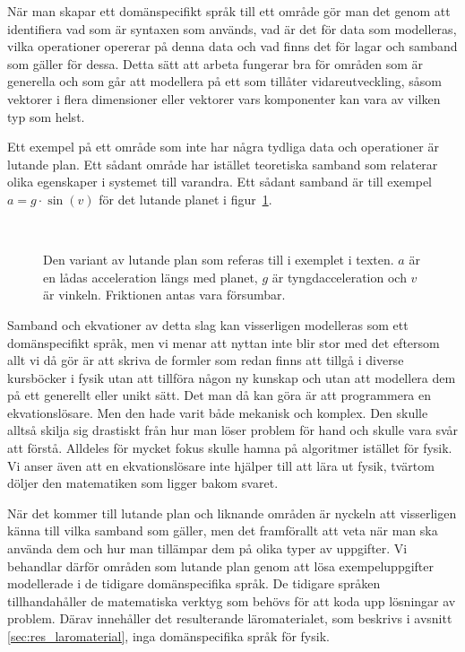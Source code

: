 \begin{draft}
När man skapar ett domänspecifikt språk till ett område gör man det genom att
identifiera vad som är syntaxen som används, vad är det för data som modelleras,
vilka operationer opererar på denna data och vad finns det för lagar och samband
som gäller för dessa. Detta sätt att arbeta fungerar bra för områden som är
generella och som går att modellera på ett som tillåter vidareutveckling, såsom
vektorer i flera dimensioner eller vektorer vars komponenter kan vara av vilken
typ som helst.

Ett exempel på ett område som inte har några tydliga data och operationer är
lutande plan. Ett sådant område har istället teoretiska samband som relaterar
olika egenskaper i systemet till varandra. Ett sådant samband är till exempel $a = g \cdot \sin(v)$ för det lutande planet i figur~\ref{fig:lutande_plan}.

\begin{figure}[tph]
  \centering
  \caption{Den variant av lutande plan som referas till i exemplet i texten. $a$
  är en lådas acceleration längs med planet, $g$ är tyngdacceleration och $v$ är
  vinkeln. Friktionen antas vara försumbar.}~\label{fig:lutande_plan}
\end{figure}

Samband och ekvationer av detta slag kan visserligen modelleras som ett domänspecifikt
språk, men vi menar att nyttan inte blir stor med det eftersom allt vi då gör är
att skriva de formler som redan finns att tillgå i diverse kursböcker i fysik
utan att tillföra någon ny kunskap och utan att modellera dem på ett generellt
eller unikt sätt. Det man då kan göra är att programmera en ekvationslösare. Men
den hade varit både mekanisk och komplex. Den skulle alltså skilja sig
drastiskt från hur man löser problem för hand och skulle vara svår att förstå.
Alldeles för mycket fokus skulle hamna på algoritmer istället för fysik. Vi
anser även att en ekvationslösare inte hjälper till att lära ut fysik, tvärtom
döljer den matematiken som ligger bakom svaret.

När det kommer till lutande plan och liknande områden är nyckeln att visserligen
känna till vilka samband som gäller, men det framförallt att veta när man ska
använda dem och hur man tillämpar dem på olika typer av uppgifter. Vi behandlar
därför områden som lutande plan genom att lösa exempeluppgifter modellerade i de
tidigare domänspecifika språk. De tidigare språken tillhandahåller de matematiska
verktyg som behövs för att koda upp lösningar av problem. Därav innehåller det resulterande läromaterialet, som beskrivs i avsnitt \ref{sec:res_laromaterial}, inga domänspecifika språk för fysik.


\end{draft}

